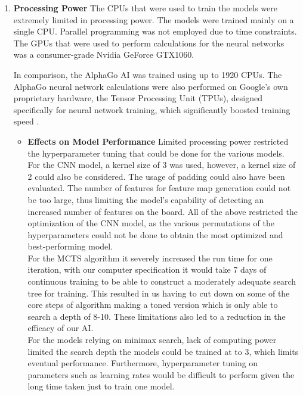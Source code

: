 \documentclass[a4paper,12pt,table]{article}
\begin{document}
\begin{enumerate}
    \item \textbf{Processing Power}
    \newline
    The CPUs that were used to train the models were extremely limited in processing power. The models were trained mainly on a single CPU. Parallel programming was not employed due to time constraints. The GPUs that were used to perform calculations for the neural networks was a consumer-grade Nvidia GeForce GTX1060. \par

    In comparison, the AlphaGo AI was trained using up to 1920 CPUs. The AlphaGo neural network calculations were also performed on Google’s own proprietary hardware, the Tensor Processing Unit (TPUs), designed specifically for neural network training, which significantly boosted training speed \cite{Mastering the game of Go with deep neural networks and tree search}. \par

    \begin{itemize}
        \item \textbf{Effects on Model Performance}
        \newline
        Limited processing power restricted the hyperparameter tuning that could be done for the various models. \\

        For the CNN model, a kernel size of 3 was used, however, a kernel size of 2 could also be considered. The usage of padding could also have been evaluated. The number of features for feature map generation could not be too large, thus limiting the model’s capability of detecting an increased number of features on the board. All of the above restricted the optimization of the CNN model, as the various permutations of the hyperparameters could not be done to obtain the most optimized and best-performing model. \\

        For the MCTS algorithm it severely increased the run time for one iteration, with our computer specification it would take 7 days of continuous training to be able to construct a moderately adequate search tree for training. This resulted in us having to cut down on some of the core steps of algorithm making a toned version which is only able to search a depth of 8-10. These limitations also led to a reduction in the efficacy of our AI. \\

        For the models relying on minimax search, lack of computing power limited the search depth the models could be trained at to 3, which limits eventual performance. Furthermore, hyperparameter tuning on parameters such as learning rates would be difficult to perform given the long time taken just to train one model.


\end{itemize}
\end{enumerate}
\end{document}
